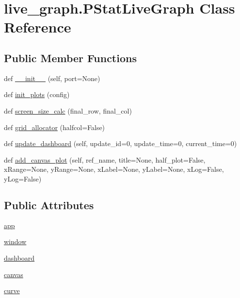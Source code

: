 \hypertarget{classlive__graph_1_1PStatLiveGraph}{}\section{live\+\_\+graph.\+P\+Stat\+Live\+Graph Class Reference}
\label{classlive__graph_1_1PStatLiveGraph}
\subsection*{Public Member Functions}
\begin{DoxyCompactItemize}
\item 
def \hyperlink{classlive__graph_1_1PStatLiveGraph_a210a499fd4e06392f8f5fffc209971a4}{\+\_\+\+\_\+init\+\_\+\+\_\+} (self, port=None)
\item 
def \hyperlink{classlive__graph_1_1PStatLiveGraph_a65b6193384abea9656044a84a6112eb2}{init\+\_\+plots} (config)
\item 
def \hyperlink{classlive__graph_1_1PStatLiveGraph_a7730f214090df612485e42ae758beb3e}{screen\+\_\+size\+\_\+calc} (final\+\_\+row, final\+\_\+col)
\item 
def \hyperlink{classlive__graph_1_1PStatLiveGraph_a4969c53cd50f31c9b50d86a7cac77a63}{grid\+\_\+allocator} (halfcol=False)
\item 
def \hyperlink{classlive__graph_1_1PStatLiveGraph_af167003562729fe08284e8f5675b26e2}{update\+\_\+dashboard} (self, update\+\_\+id=0, update\+\_\+time=0, current\+\_\+time=0)
\item 
def \hyperlink{classlive__graph_1_1PStatLiveGraph_abfe72ecd8755e0cc4870ecbd560d45c3}{add\+\_\+canvas\+\_\+plot} (self, ref\+\_\+name, title=None, half\+\_\+plot=False, x\+Range=None, y\+Range=None, x\+Label=None, y\+Label=None, x\+Log=False, y\+Log=False)
\end{DoxyCompactItemize}
\subsection*{Public Attributes}
\begin{DoxyCompactItemize}
\item 
\hyperlink{classlive__graph_1_1PStatLiveGraph_ad6b3c5024c9472884e04570fd1890f17}{app}
\item 
\hyperlink{classlive__graph_1_1PStatLiveGraph_a8cc1373f90af09e389d1da5a5b594492}{window}
\item 
\hyperlink{classlive__graph_1_1PStatLiveGraph_aff87cd16c9d35e895cd3d9657fade256}{dashboard}
\item 
\hyperlink{classlive__graph_1_1PStatLiveGraph_aeed29aeb8e32076da7227cbbda1902ca}{canvas}
\item 
\hyperlink{classlive__graph_1_1PStatLiveGraph_aa5302d2ec7274abb0b35c293ebd428e8}{curve}
\end{DoxyCompactItemize}
